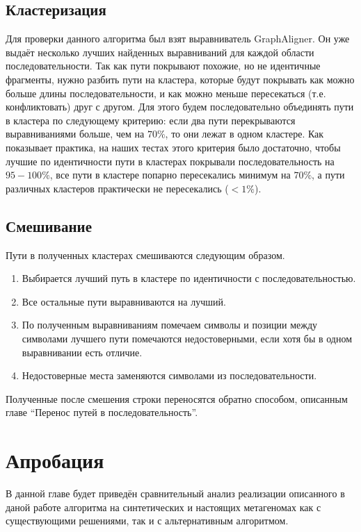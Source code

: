\documentclass[14pt]{matmex-diploma-custom}
\begin{document}
\subsection{Кластеризация}
\begin{sloppypar}
Для проверки данного алгоритма был взят выравниватель GraphAligner. Он уже выдаёт несколько лучших найденных выравниваний для каждой области последовательности. Так как пути покрывают похожие, но не идентичные фрагменты, нужно разбить пути на кластера, которые будут покрывать как можно больше длины последовательности, и как можно меньше пересекаться (т.е. конфликтовать) друг с другом. Для этого будем последовательно объединять пути в кластера по следующему критерию: если два пути перекрываются выравниваниями больше, чем на $70\%$, то они лежат в одном кластере. Как показывает практика, на наших тестах этого критерия было достаточно, чтобы лучшие по идентичности пути в кластерах покрывали последовательность на $95-100\%$, все пути в кластере попарно пересекались минимум на $70\%$, а пути различных кластеров практически не пересекались ($<1\%$).
\end{sloppypar}

\subsection{Смешивание}
Пути в полученных кластерах смешиваются следующим образом.
\begin{enumerate}
    \item Выбирается лучший путь в кластере по идентичности с последовательностью.
    \item Все остальные пути выравниваются на лучший.
    \item По полученным выравниваниям помечаем символы и позиции между символами лучшего пути помечаются недостоверными, если хотя бы в одном выравнивании есть отличие.
    \item Недостоверные места заменяются символами из последовательности.
\end{enumerate}

Полученные после смешения строки переносятся обратно способом, описанным главе ``Перенос путей в последовательность''.


\section{Апробация}
В данной главе будет приведён сравнительный анализ реализации описанного в даной работе алгоритма на синтетических и настоящих метагеномах как с существующими решениями, так и с альтернативным алгоритмом.
\end{document}
